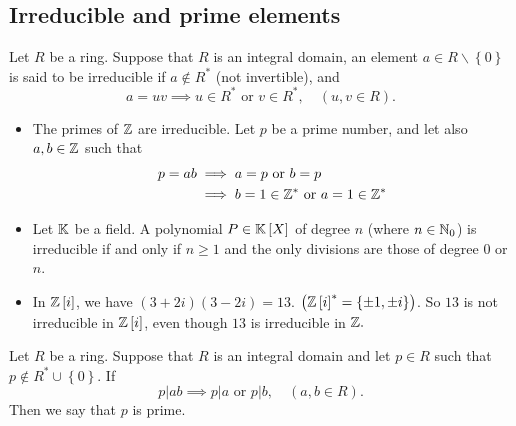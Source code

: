 \subsection{Irreducible and prime elements}
\begin{definition}[]
Let $R$ be a ring. Suppose that $R$ is an integral domain, an element
$a \in  R \backslash  \left\{ 0 \right\}$ is said to be 
irreducible if $ a \notin  R^{*}$ (not invertible), and 
\[
a = uv \implies u \in  R ^{*} \text{ or }  v \in  R^{*},
\quad (u, v \in  R).
\]
\end{definition}
\begin{example}
\begin{itemize}
  \item The primes of $\mathbb{Z}$ are irreducible. Let $p$ be a prime number, and 
    let also $a, b \in  \mathbb{Z}$ such that
    \begin{align*}
    p = ab &\implies  a = p \text{ or }  b = p \\
           & \implies 
           b = 1 \in  \mathbb{Z}^{*} \text{ or }  
           a = 1 \in  \mathbb{Z}^{*}
    \end{align*}
   \item Let $\mathbb{K}$ be a field. A polynomial $P \in  \mathbb{K}\left[ X \right]$  of degree $n$ (where $n \in  \mathbb{N}_0$) is irreducible if and only if 
     $n \geq 1$ and the only divisions are those of degree 
     $0$ or $n$. 
    \item In $\mathbb{Z}\left[ i \right]$, we have 
      $\left( 3 + 2i \right) \left( 3 - 2i \right) = 13$. 
      $\left( \mathbb{Z}\left[ i \right]^{*} = \left\{ \pm 1, \pm i \right\}  \right) $.
      So $13$ is not irreducible in $\mathbb{Z}\left[ i \right]$, even though 
      $13$ is irreducible in $\mathbb{Z}.$  
\end{itemize}
\end{example}
\begin{definition}[]
Let $R$ be a ring. Suppose that $R$ is an integral domain and 
let $p \in R$ such that $p \notin  R^{*} \cup \left\{ 0 \right\}$. If 
\[
p|ab \implies 
p|a \text{ or }  p|b, \quad  \left( a, b \in  R \right).
\]
Then we say that $p$ is prime. 
\end{definition}
